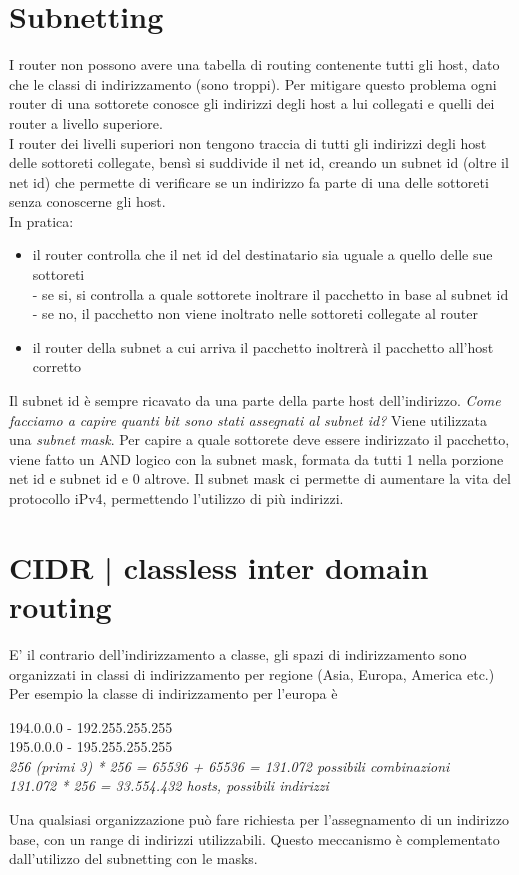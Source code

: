 \documentclass[11pt, oneside]{article}   	%
\begin{document}
\section*{Subnetting} 
I router non possono avere una tabella di routing contenente tutti gli host, dato che le classi di indirizzamento (sono troppi). Per mitigare questo problema ogni router di una sottorete conosce gli indirizzi degli host a lui collegati e quelli dei router a livello superiore.\\
I router dei livelli superiori non tengono traccia di tutti gli indirizzi degli host delle sottoreti collegate, bensì si suddivide il net id, creando un subnet id (oltre il net id) che permette di verificare se un indirizzo fa parte di una delle sottoreti senza conoscerne gli host. \\In pratica:
\begin{itemize}
\item il router controlla che il net id del destinatario sia uguale a quello delle sue sottoreti \\
- se si, si controlla a quale sottorete inoltrare il pacchetto in base al subnet id \\
- se no, il pacchetto non viene inoltrato nelle sottoreti collegate al router\\
\item il router della subnet a cui arriva il pacchetto inoltrerà il pacchetto all'host corretto
\end{itemize}
Il subnet id è sempre ricavato da una parte della parte host dell'indirizzo. \emph{Come facciamo a capire quanti bit sono stati assegnati al subnet id?} Viene utilizzata una \emph{subnet mask}.
Per capire a quale sottorete deve essere indirizzato il pacchetto, viene fatto un AND logico con la subnet mask, formata da tutti 1 nella porzione net id e subnet id e 0 altrove. Il subnet mask ci permette di aumentare la vita del protocollo iPv4, permettendo l'utilizzo di più indirizzi.
\section*{CIDR | classless inter domain routing}
E' il contrario dell'indirizzamento a classe, gli spazi di indirizzamento sono organizzati in classi di indirizzamento per regione (Asia, Europa, America etc.)
Per esempio la classe di indirizzamento per l'europa è
\begin{center}
194.0.0.0 - 192.255.255.255\\
195.0.0.0 -  195.255.255.255\\
\emph{256 (primi 3) * 256 = 65536 + 65536 = 131.072 possibili combinazioni}\\
\emph{131.072 * 256 = 33.554.432 hosts, possibili indirizzi}
\end{center}
Una qualsiasi organizzazione può fare richiesta per l'assegnamento di un indirizzo base, con un  range di indirizzi utilizzabili. Questo meccanismo è complementato dall'utilizzo del subnetting con le masks.
\end{document}
